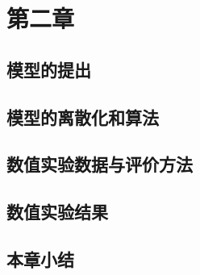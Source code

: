 
\chapter{第二章}
\label{chap:chap2}

\section{模型的提出}
\section{模型的离散化和算法}
\section{数值实验数据与评价方法}
\section{数值实验结果}
\section{本章小结}

















